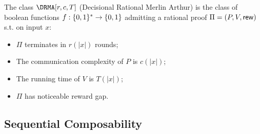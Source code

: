 \begin{definition}
The class $\DRMA[r, c, T]$ (Decisional Rational Merlin Arthur)
is the class of boolean functions $f : \{0, 1\}^{*} \to \{0, 1\}$ admitting a rational proof $\Pi = (P,V, \mathsf{rew})$ s.t. on input $x$:
\begin{itemize}
    \item $\Pi$ terminates in $r(|x|)$ rounds;
    \item The communication complexity of $P$ is $c(|x|)$;
    \item The running time of $V$ is $T(|x|)$;
    \item $\Pi$ has noticeable reward gap.
\end{itemize}
\end{definition}


\begin{comment}
A composition theorem (in its weak version: for yes/no Rational Proofs):
\begin{theorem}
Let $\protOne = (P_1, V_1^{L_2})$ be a (yes/no) rational proof for language $L_1$ with noticeable reward gap and let $V^{L_2}$ have oracle access to language $L_2$ with at most $O(1)$ queries.
Let $\protTwo (P_2, V_2)$ be a (yes/no) rational proof for $L_2$ with noticeable reward gap.
Then there exists a (yes/no) rational proof $\pi$ for $L_1$ with noticeable reward gap.
Moreover if $\protOne$ and $\protTwo$ have round, communication and verification complexity respectively $r_1(n), cc_1(n), T_1(n)$  and $r_2(n), cc_2(n), T_2(n)$ then language $L_1 \in DRMA[r_1(n) + O(r_2(n)), cc_1(n) + O(cc_2(n)), T_1(n) + O(T_2(n))]$
\end{theorem}
\end{comment}




\subsection{Sequential Composability}
\label{sec:sq-def}
